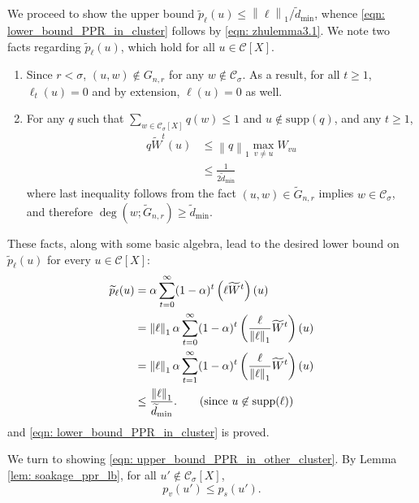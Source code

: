\documentclass[11pt,twoside]{article}
\theoremstyle{definition}
\newcommand{\norm}[1]{\left\lVert#1\right\rVert}
\newcommand{\1}{\mathbbm{1}}
\newcommand{\pbf}{p}        %
\newcommand{\Xbf}{X}
\newcommand{\Wbf}{W}
\newcommand{\Cset}{\mathcal{C}}
\newcommand{\Csig}{\Cset_{\sigma}}
\newcommand{\degminwt}{\widetilde{d}_{\min}}
\begin{document}
	We proceed to show the upper bound $\widetilde{\pbf}_{\ell}(u) \leq \norm{\ell}_1 / \degminwt$, whence \eqref{eqn: lower_bound_PPR_in_cluster} follows by \eqref{eqn: zhulemma3.1}. We note two facts regarding $\widetilde{\pbf}_{\ell}(u)$, which hold for all $u \in \Cset[\Xbf]$. 
	\begin{enumerate}
		\item Since $r < \sigma$, $(u,w) \not\in G_{n,r}$ for any $w \not\in \Csig$. As a result, for all $t \geq 1$, $\ell_t(u) = 0$ and by extension, $\ell(u) = 0$ as well.
		\item For any $q$ such that $\sum_{w \in \Csig[\Xbf]} q(w) \leq 1$ and $u \not\in \mathrm{supp}(q)$, and any $t \geq 1$,
		\begin{align}
		\label{eqn: one_step_bound}
		q \widetilde{\Wbf}^t (u) & \leq \norm{q}_1 \max_{v \neq u} W_{vu} \nonumber \\
		& \leq \frac{1}{2\degminwt} 
		\end{align}
		where last inequality follows from the fact $(u,w) \in \widetilde{G}_{n,r}$ implies $w \in \Csig$, and therefore $\deg(w; \widetilde{G}_{n,r}) \geq \degminwt$.
	\end{enumerate}
	
	These facts, along with some basic algebra, lead to the desired lower bound on $\widetilde{\pbf}_{\ell}(u)$ for every $u \in \Cset[\Xbf]$:
	\begin{align*}
	\widetilde{\pbf}_{\ell}(u) & = \alpha \sum_{t = 0}^{\infty} (1 - \alpha)^t \left(\ell \widetilde{\Wbf}^t \right)(u)  \nonumber \\
	& = \norm{\ell}_1 \alpha \sum_{t = 0}^{\infty} (1 - \alpha)^t \left(\frac{\ell}{\norm{\ell}_1}  \widetilde{\Wbf}^t \right)(u)\nonumber \\
	& = \norm{\ell}_1 \alpha \sum_{t = 1}^{\infty} (1 - \alpha)^t \left(\frac{\ell}{\norm{\ell}_1}  \widetilde{\Wbf}^t \right)(u)\nonumber \\
	& \leq \frac{\norm{\ell}_1 }{\degminwt}. \tag{since $u \not\in \mathrm{supp}(\ell)$}
	\end{align*}
	and \eqref{eqn: lower_bound_PPR_in_cluster} is proved.
	
	We turn to showing \eqref{eqn: upper_bound_PPR_in_other_cluster}. By Lemma \ref{lem: soakage_ppr_lb}, for all $u' \not\in \Csig[\Xbf]$,
	\begin{equation*}
	\pbf_v(u') \leq \pbf_s(u').
	\end{equation*}
	
\end{document}
